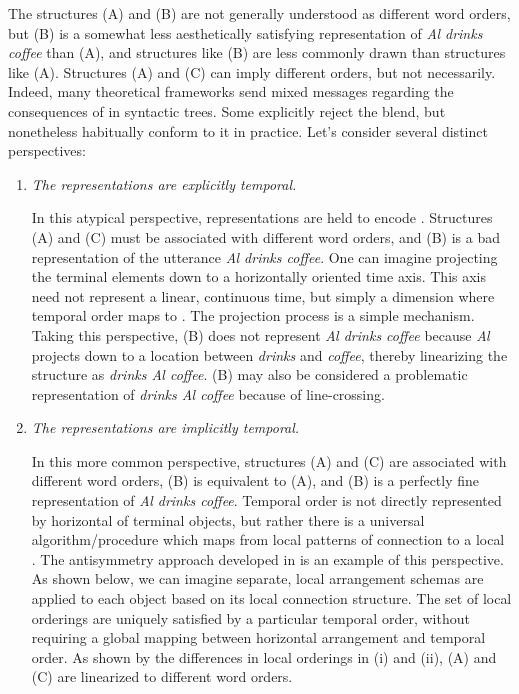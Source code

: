 The structures (A) and (B) are not generally understood as different word orders, but (B) is a somewhat less aesthetically satisfying representation of \textit{Al drinks coffee} than (A), and structures like (B) are less commonly drawn than structures like (A). Structures (A) and (C) can imply different orders, but not necessarily. Indeed, many theoretical frameworks send mixed messages regarding the consequences of  in syntactic trees. Some explicitly reject the blend, but nonetheless habitually conform to it in practice. Let's consider several distinct perspectives:

\begin{enumerate}
\item \textit{The representations are explicitly temporal.}

  In this atypical perspective, representations are held to encode . Structures (A) and (C) must be associated with different word orders, and (B) is a bad representation of the utterance \textit{Al drinks coffee}. One can imagine projecting the terminal elements down to a horizontally oriented time axis. This axis need not represent a linear, continuous time, but simply a dimension where temporal order maps to . The projection process is a simple  mechanism. Taking this perspective, (B) does not represent \textit{Al drinks coffee} because \textit{Al} projects down to a location between \textit{drinks} and \textit{coffee}, thereby linearizing the structure as \textit{drinks Al coffee}. (B) may also be considered a problematic representation of \textit{drinks Al coffee} because of line-crossing.

\item \textit{The representations are implicitly temporal.}

  In this more common perspective, structures (A) and (C) are associated with different word orders, (B) is equivalent to (A), and (B) is a perfectly fine representation of \textit{Al drinks coffee}. Temporal order is not directly represented by horizontal  of terminal objects, but rather there is a universal algorithm/procedure which maps from local patterns of connection to a local . The antisymmetry approach developed in \citet{Kayne1994} is an example of this perspective. As shown below, we can imagine separate, local arrangement schemas are applied to each object based on its local connection structure. The set of local orderings are uniquely satisfied by a particular temporal order, without requiring a global mapping between horizontal arrangement and temporal order. As shown by the differences in local orderings in {} (i) and (ii), {}(A) and (C) are linearized to different word orders.


\end{enumerate}
